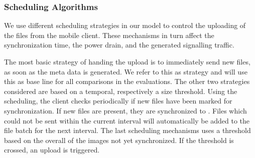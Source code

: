 \subsubsection*{Scheduling Algorithms}\label{sec:application:cloud_file_synchronisation:system_model:algorithms}
We use different scheduling strategies in our model to control the uploading of the files from the mobile client.
These mechanisms in turn affect the synchronization time, the power drain, and the generated signalling traffic.

The most basic strategy of handing the upload is to immediately send new files, as soon as the meta data is generated.
We refer to this as \algoimmediate strategy and will use this as base line for all comparisons in the evaluations.
The other two strategies considered are based on a temporal, respectively a size threshold. 
Using the \algointerval scheduling, the client checks periodically if new files have been marked for synchronization.
If new files are present, they are synchronized to \dropbox.
Files which could not be sent within the current interval will automatically be added to the file batch for the next interval. 
The last scheduling mechanisms uses a threshold based on the overall \algosize of the images not yet synchronized.
If the threshold is crossed, an upload is triggered.
